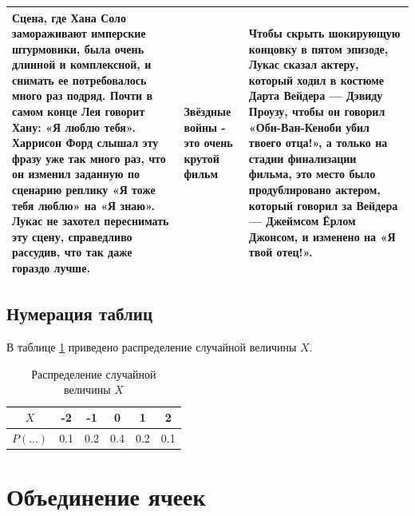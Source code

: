 \documentclass[12pt, a4paper]{article}
\begin{document}
\begin{tabulary}{\textwidth}{|L|J|L|}
	\hline
	Сцена, где Хана Соло замораживают имперские штурмовики, была очень длинной и комплексной, и снимать ее потребовалось много раз подряд. Почти в самом конце Лея говорит Хану: «Я люблю тебя». Харрисон Форд слышал эту фразу уже так много раз, что он изменил заданную по сценарию реплику «Я тоже тебя люблю» на «Я знаю». Лукас не захотел переснимать эту сцену, справедливо рассудив, что так даже гораздо лучше. & Звёздные войны - это очень крутой фильм & Чтобы скрыть шокирующую концовку в пятом эпизоде, Лукас сказал актеру, который ходил в костюме Дарта Вейдера — Дэвиду Проузу, чтобы он говорил «Оби-Ван-Кеноби убил твоего отца!», а только на стадии финализации фильма, это место было продублировано актером, который говорил за Вейдера — Джеймсом Ёрлом Джонсом, и изменено на «Я твой отец!». \\
	\hline
\end{tabulary}



\subsection{Нумерация таблиц}

В таблице \ref{tab:random} приведено распределение случайной величины $X$.

\begin{table}[h!]
\begin{center}
\begin{tabular}{|c|c|c|c|c|c|}
\hline
$X$ & -2 & -1 & 0 & 1 & 2 \\
\hline
$P(\ldots)$ & 0.1 & 0.2 & 0.4 & 0.2 & 0.1 \\
\hline
\end{tabular}
\caption{Распределение случайной величины $X$}\label{tab:random}
\end{center}
\end{table}




\section{Объединение ячеек}
\end{document}
